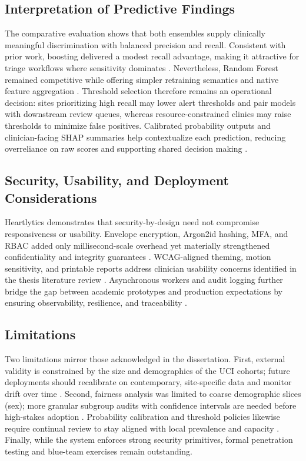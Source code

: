 \documentclass[conference]{IEEEtran}
\begin{document}
\subsection{Interpretation of Predictive Findings}
The comparative evaluation shows that both ensembles supply clinically meaningful discrimination with balanced precision and recall. Consistent with prior work, boosting delivered a modest recall advantage, making it attractive for triage workflows where sensitivity dominates \cite{chen2016xgboost}. Nevertheless, Random Forest remained competitive while offering simpler retraining semantics and native feature aggregation \cite{breiman2001random}. Threshold selection therefore remains an operational decision: sites prioritizing high recall may lower alert thresholds and pair models with downstream review queues, whereas resource-constrained clinics may raise thresholds to minimize false positives. Calibrated probability outputs and clinician-facing SHAP summaries help contextualize each prediction, reducing overreliance on raw scores and supporting shared decision making \cite{lundberg2017unified}.

\subsection{Security, Usability, and Deployment Considerations}
Heartlytics demonstrates that security-by-design need not compromise responsiveness or usability. Envelope encryption, Argon2id hashing, MFA, and RBAC added only millisecond-scale overhead yet materially strengthened confidentiality and integrity guarantees \cite{dworkin2007recommendation, biryukov2015argon2, ferraiolo2001proposed}. WCAG-aligned theming, motion sensitivity, and printable reports address clinician usability concerns identified in the thesis literature review \cite{w3c_wcag21, oshero2012improving}. Asynchronous workers and audit logging further bridge the gap between academic prototypes and production expectations by ensuring observability, resilience, and traceability \cite{howard2006security, celery}.

\subsection{Limitations}
Two limitations mirror those acknowledged in the dissertation. First, external validity is constrained by the size and demographics of the UCI cohorts; future deployments should recalibrate on contemporary, site-specific data and monitor drift over time \cite{mitchell2019model}. Second, fairness analysis was limited to coarse demographic slices (sex); more granular subgroup audits with confidence intervals are needed before high-stakes adoption \cite{barocas2019fairness}. Probability calibration and threshold policies likewise require continual review to stay aligned with local prevalence and capacity \cite{platt1999probabilistic}. Finally, while the system enforces strong security primitives, formal penetration testing and blue-team exercises remain outstanding.
\end{document}
